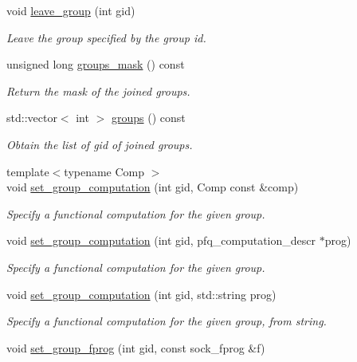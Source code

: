 \begin{DoxyCompactItemize}
void \hyperlink{classpfq_1_1socket_ac512d6b89db52da73a51ba9112658180}{leave\+\_\+group} (int gid)
\begin{DoxyCompactList}\small\item\em Leave the group specified by the group id. \end{DoxyCompactList}\item 
unsigned long \hyperlink{classpfq_1_1socket_a45c12f4255af4eb74bb9a75d8e1a56eb}{groups\+\_\+mask} () const 
\begin{DoxyCompactList}\small\item\em Return the mask of the joined groups. \end{DoxyCompactList}\item 
std\+::vector$<$ int $>$ \hyperlink{classpfq_1_1socket_a7bb02f670cf9c16b4339f650c7b80de7}{groups} () const 
\begin{DoxyCompactList}\small\item\em Obtain the list of gid of joined groups. \end{DoxyCompactList}\item 
{\footnotesize template$<$typename Comp $>$ }\\void \hyperlink{classpfq_1_1socket_a5cb37765ffcb1b78c5d61211f9e806df}{set\+\_\+group\+\_\+computation} (int gid, Comp const \&comp)
\begin{DoxyCompactList}\small\item\em Specify a functional computation for the given group. \end{DoxyCompactList}\item 
void \hyperlink{classpfq_1_1socket_acd2ef781a82b49566f03a085ba091138}{set\+\_\+group\+\_\+computation} (int gid, pfq\+\_\+computation\+\_\+descr $\ast$prog)
\begin{DoxyCompactList}\small\item\em Specify a functional computation for the given group. \end{DoxyCompactList}\item 
void \hyperlink{classpfq_1_1socket_a968ae9e3375650990488dcb1784a4bd1}{set\+\_\+group\+\_\+computation} (int gid, std\+::string prog)
\begin{DoxyCompactList}\small\item\em Specify a functional computation for the given group, from string. \end{DoxyCompactList}\item 
void \hyperlink{classpfq_1_1socket_ad618894910a12a08eaed3d8668db25af}{set\+\_\+group\+\_\+fprog} (int gid, const sock\+\_\+fprog \&f)

\end{DoxyCompactItemize}
